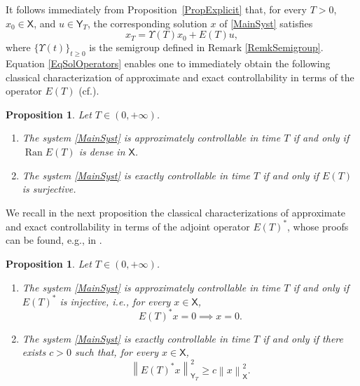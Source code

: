 \documentclass[10pt]{article}
\newcommand{\ie}{i.e.,\xspace}
\newcommand{\eg}{e.g.,\xspace}
\newcommand{\cf}{cf.\xspace}
\renewcommand{\eg}{e.g.,\xspace}
\theoremstyle{plain}
\newtheorem{prop}[theo]{Proposition}
\theoremstyle{definition}
\DeclareMathOperator{\range}{Ran}
\newcommand{\norm}[1]{\left\lVert #1\right\lVert}
\numberwithin{equation}{section}\numberwithin{figure}{section}\emergencystretch=3em
\begin{document}
It follows immediately from Proposition~\ref{PropExplicit} that, for every $T > 0$, $x_0 \in \mathsf X$, and $u \in \mathsf Y_T$, the corresponding solution $x$ of \eqref{MainSyst} satisfies\vspace*{-3pt}
\begin{equation}
\label{EqSolOperators}
x_T = \Upsilon(T) x_0 + E(T) u,
\end{equation}
where $\{\Upsilon(t)\}_{t \geq 0}$ is the semigroup defined in Remark \ref{RemkSemigroup}. Equation \eqref{EqSolOperators} enables one to immediately obtain the following classical characterization of approximate and exact controllability in terms of the operator $E(T)$ (\cf \cite[Lem.\,2.46]{Coron2007Control}).

\begin{prop}
\label{PropETControl}
Let $T \in (0, +\infty)$.
\begin{enumerate}
\item\label{PropETControlApprox} The system \eqref{MainSyst} is approximately controllable in time $T$ if and only if $\range E(T)$ is dense in $\mathsf X$.
\item\label{PropETControlExact} The system \eqref{MainSyst} is exactly controllable in time $T$ if and only if $E(T)$ is surjective.
\end{enumerate}
\end{prop}

We recall in the next proposition the classical characterizations of approximate and exact controllability in terms of the adjoint operator $E(T)^\ast$, whose proofs can be found, \eg in \cite[\S 2.3.2]{Coron2007Control}.

\begin{prop}
\label{PropControl}
Let $T \in (0, +\infty)$.
\begin{enumerate}
\item The system \eqref{MainSyst} is approximately controllable in time $T$ if and only if $E(T)^\ast$ is injective, \ie for every $x \in \mathsf X$,
\begin{equation}
\label{UniqueContinuation}
E(T)^\ast x = 0 \implies x = 0.
\end{equation}

\item\label{ControlExactETAst} The system \eqref{MainSyst} is exactly controllable in time $T$ if and only if there exists $c > 0$ such that, for every $x \in \mathsf X$,
\begin{equation}
\label{ObservabilityInequality}
\norm{E(T)^\ast x}_{\mathsf Y_T}^2 \geq c \norm{x}_{\mathsf X}^2.
\end{equation}
\end{enumerate}
\end{prop}
\end{document}
